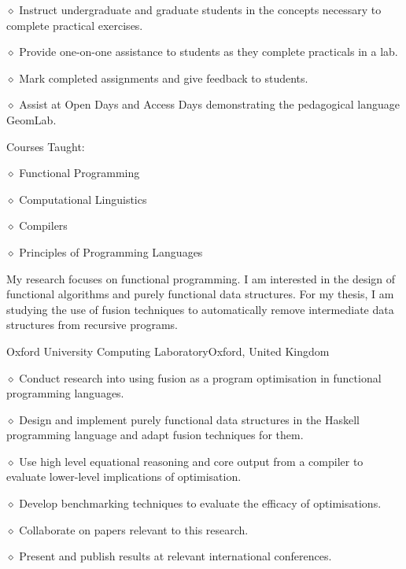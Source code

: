 \bigskip


\smallskip

\parindent=20pt
\item{$\diamond$} Instruct undergraduate and graduate students in the
concepts necessary to complete practical exercises.
\item{$\diamond$} Provide one-on-one assistance to students as they
complete practicals in a lab.
\item{$\diamond$} Mark completed assignments and give feedback to students.
\item{$\diamond$} Assist at Open Days and Access Days demonstrating
the pedagogical language GeomLab.
\parindent=0pt

\smallskip

\parindent=20pt
\indent Courses Taught:
\parindent=40pt
\item{$\diamond$} Functional Programming
\item{$\diamond$} Computational Linguistics
\item{$\diamond$} Compilers
\item{$\diamond$} Principles of Programming Languages
\parindent=0pt

\bigskip


My research focuses on functional programming.  I am interested in the
design of functional algorithms and purely functional data structures.
For my thesis, I am studying the use of fusion techniques to automatically
remove intermediate data structures from recursive programs.  

\bigskip


{Oxford University Computing Laboratory}{Oxford, United Kingdom}
\medskip

\parindent=20pt
\item{$\diamond$} Conduct research into using fusion as a program
optimisation in functional programming languages. 
\item{$\diamond$} Design and implement purely functional data
structures in the Haskell programming language and adapt fusion
techniques for them. 
\item{$\diamond$} Use high level equational reasoning
and core output from a compiler to evaluate lower-level implications of
optimisation. 
\item{$\diamond$} Develop benchmarking techniques to evaluate the efficacy of
optimisations.
\item{$\diamond$} Collaborate on papers relevant to this research.
\item{$\diamond$} Present and publish results at relevant international conferences.
\parindent=0pt

